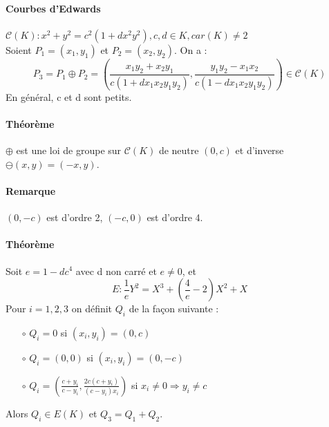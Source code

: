 \documentclass[12pt,a4paper]{report}
\begin{document}
\paragraph{Courbes d'Edwards\\}
$\mathcal{C}(K) : x^2 + y^2 = c^2(1+dx^2y^2), c,d \in K, car(K) \neq 2 $\\
Soient $ P_1 = (x_1,y_1)$ et $ P_2=(x_2,y_2)$. On a :
$$ P_3 = P_1 \oplus P_2 = \left( \frac{x_1y_2+x_2y_1}{c(1+dx_1x_2y_1y_2)},\frac{y_1y_2-x_1x_2}{c(1-dx_1x_2y_1y_2)}\right) \in \mathcal{C}(K) $$
En général, c et d sont petits.
\paragraph{Théorème\\}
$\oplus$ est une loi de groupe sur $ \mathcal{C}(K)$ de neutre $(0,c)$ et d'inverse \\$\ominus (x,y) = (-x,y)$.
\paragraph{Remarque\\}
$(0,-c)$ est d'ordre 2, $(-c,0)$ est d'ordre 4.
\paragraph{Théorème\\}
Soit $e=1-dc^4$ avec d non carré et $ e \neq 0$, et $$\displaystyle E:\frac{1}{e} Y^2 = X^3 + \left(\frac{4}{e}-2\right) X^2 + X $$ Pour $i=1,2,3$ on définit $ Q_i$ de la façon suivante :
\begin{itemize}
\item[$\circ$] $Q_i = 0 $ si $(x_i,y_i)=(0,c)$
\item[]
\item[$\circ$] $Q_i=(0,0) $ si $ (x_i,y_i) = (0,-c)$
\item[]
\item[$\circ$] $ \displaystyle Q_i=\left(\frac{c+y_i}{c-y_i},\frac{2c(c+y_i)}{(c-y_i)x_i}\right)$ si $ x_i \neq 0 \Rightarrow y_i \neq c$
\item[]
\end{itemize}
Alors $ Q_i \in E(K) $ et $ Q_3 = Q_1 + Q_2$.
\end{document}
